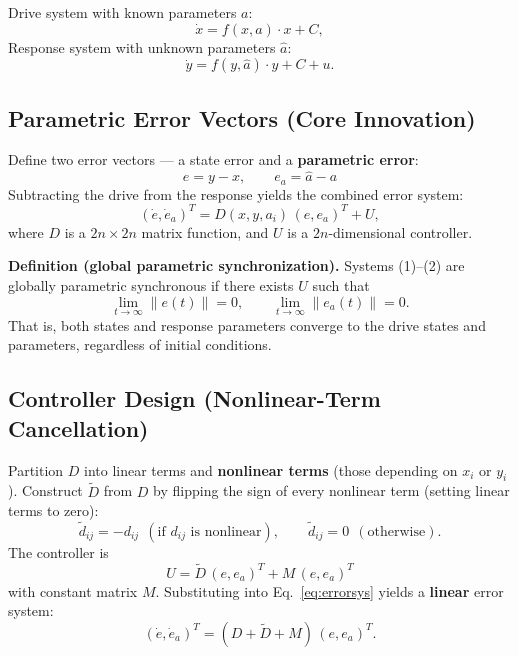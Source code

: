 \documentclass[11pt,a4paper]{article}
\begin{document}
Drive system with known parameters $a$:
\begin{equation}
\dot{x} = f(x, a) \cdot x + C,
\label{eq:drive}
\end{equation}
Response system with unknown parameters $\hat{a}$:
\begin{equation}
\dot{y} = f(y, \hat{a}) \cdot y + C + u.
\label{eq:response}
\end{equation}

\subsection{Parametric Error Vectors (Core Innovation)}

Define two error vectors --- a state error and a \textbf{parametric error}:
\begin{equation}
\boxed{e = y - x, \qquad e_a = \hat{a} - a}
\label{eq:error}
\end{equation}
Subtracting the drive from the response yields the combined error system:
\begin{equation}
(\dot e, \dot e_a)^T = D(x,y,a_i)\,(e, e_a)^T + U,
\label{eq:errorsys}
\end{equation}
where $D$ is a $2n\times 2n$ matrix function, and $U$ is a $2n$-dimensional controller.

\textbf{Definition (global parametric synchronization).} Systems (1)--(2) are globally parametric synchronous if there exists $U$ such that
\begin{equation}
\lim_{t\to\infty}\lVert e(t)\rVert = 0, \qquad \lim_{t\to\infty}\lVert e_a(t)\rVert = 0.
\label{eq:def}
\end{equation}
That is, both states and response parameters converge to the drive states and parameters, regardless of initial conditions.

\subsection{Controller Design (Nonlinear-Term Cancellation)}

Partition $D$ into linear terms and \textbf{nonlinear terms} (those depending on $x_i$ or $y_i$). Construct $\tilde D$ from $D$ by flipping the sign of every nonlinear term (setting linear terms to zero):
\begin{equation}
\tilde d_{ij} = -d_{ij}\ \ (\text{if } d_{ij} \text{ is nonlinear}), \qquad \tilde d_{ij} = 0\ \ (\text{otherwise}).
\end{equation}
The controller is
\begin{equation}
\boxed{U = \tilde D\,(e, e_a)^T + M\,(e, e_a)^T}
\label{eq:controller}
\end{equation}
with constant matrix $M$. Substituting into Eq.~\eqref{eq:errorsys} yields a \textbf{linear} error system:
\begin{equation}
(\dot e, \dot e_a)^T = (D + \tilde D + M)\,(e, e_a)^T.
\label{eq:closed}
\end{equation}
\end{document}
